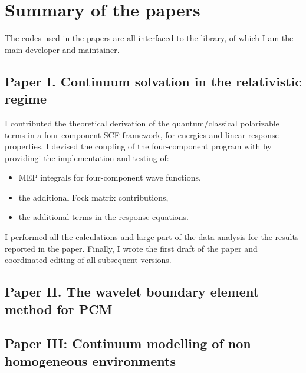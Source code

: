 \chapter{Summary of the papers}\label{ch:papers-summary}

The codes used in the papers are all interfaced to the \PCMSolver library,
of which I am the main developer and maintainer.

\section{Paper I. Continuum solvation in the relativistic regime}

I contributed the theoretical derivation of the quantum/classical polarizable
terms in a four-component \acs{SCF} framework, for energies and linear response
properties. I devised the coupling of the four-component program \DIRAC with
\PCMSolver by providingi the implementation and testing of:
\begin{itemize}
  \item \acs{MEP} integrals for four-component wave functions,
  \item the additional Fock matrix contributions,
  \item the additional terms in the response equations.
\end{itemize}
I performed all the calculations and large part of the data analysis
for the results reported in the paper.
Finally, I wrote the first draft of the paper and coordinated editing of
all subsequent versions.

\section{Paper II. The wavelet boundary element method for \acs{PCM}}
\section{Paper III: Continuum modelling of non homogeneous environments}







